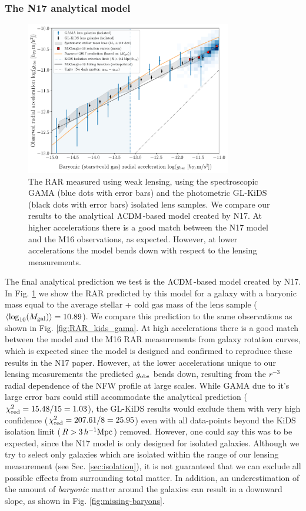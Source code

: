 \documentclass[usenatbib]{mnras}
\newcommand{\hMpc}{\, h^{-1}{\rm{Mpc}} }
\newcommand{\lcdm}{{\rm \Lambda CDM}}
\newcommand*{\meanb}[1]{\langle{#1}\rangle}
\newcommand{\un}[1]{_{\rm #1}}
\begin{document}
\subsubsection{The N17 analytical model}

\begin{figure}
	\includegraphics[width=0.8\textwidth]{Figures/RAR_KiDS+GAMA+Navarro_Nobins_isolated.pdf}
	\caption{The RAR measured using weak lensing, using the spectroscopic GAMA (blue dots with error bars) and the photometric GL-KiDS (black dots with error bars) isolated lens samples. We compare our results to the analytical $\lcdm$-based model created by N17. At higher accelerations there is a good match between the N17 model and the M16 observations, as expected. However, at lower accelerations the model bends down with respect to the lensing measurements.}
	\label{fig:RAR_Navarro}
\end{figure}

The final analytical prediction we test is the $\lcdm$-based model created by N17. In Fig. \ref{fig:RAR_Navarro} we show the RAR predicted by this model for a galaxy with a baryonic mass equal to the average stellar + cold gas mass of the lens sample ($\meanb{\log_{10}(M\un{gal})} = 10.89$). We compare this prediction to the same observations as shown in Fig. \ref{fig:RAR_kids_gama}. At high accelerations there is a good match between the model and the M16 RAR measurements from galaxy rotation curves, which is expected since the model is designed and confirmed to reproduce these results in the N17 paper. However, at the lower accelerations unique to our lensing measurements the predicted $g\un{obs}$ bends down, resulting from the $r^{-3}$ radial dependence of the NFW profile at large scales. While GAMA due to it's large error bars could still accommodate the analytical prediction ($\chi\un{red}^2 = 15.48 / 15 = 1.03$), the GL-KiDS results would exclude them with very high confidence ($\chi\un{red}^2 = 207.61 / 8 = 25.95$) even with all data-points beyond the KiDS isolation limit ($R>3 \hMpc$) removed. However, one could say this was to be expected, since the N17 model is only designed for isolated galaxies. Although we try to select only galaxies which are isolated within the range of our lensing measurement (see Sec. \ref{sec:isolation}), it is not guaranteed that we can exclude all possible effects from surrounding total matter. In addition, an underestimation of the amount of \emph{baryonic} matter around the galaxies can result in a downward slope, as shown in Fig. \ref{fig:missing-baryons}.
\end{document}
